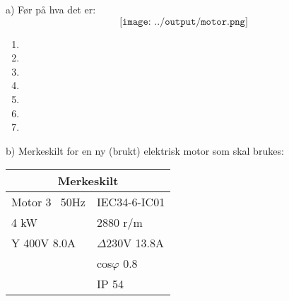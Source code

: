 

a) Før på hva det er: \\ 

$$\texttt{[image: ../output/motor.png]}$$

\begin{enumerate}
	\item 
	\item 
	\item 
	\item 
	\item 
	\item 
	\item 
\end{enumerate}

\filbreak
b) Merkeskilt for en ny (brukt) elektrisk motor som skal brukes: \\

\begin{center}
\begin{tabular}{ | m{3cm} | m{3cm} | } 
\hline
\multicolumn{2}{|c|}{Merkeskilt} \\
\hline
Motor 3~ 50Hz	& IEC34-6-IC01 \\ 
\hline
4 kW & 2880 r/m \\
\hline
Y 400V 8.0A & $\Delta$230V 13.8A \\
\hline
& cos$\varphi$ 0.8 \\
\hline
& IP 54 \\
\hline
\end{tabular}
\end{center}


